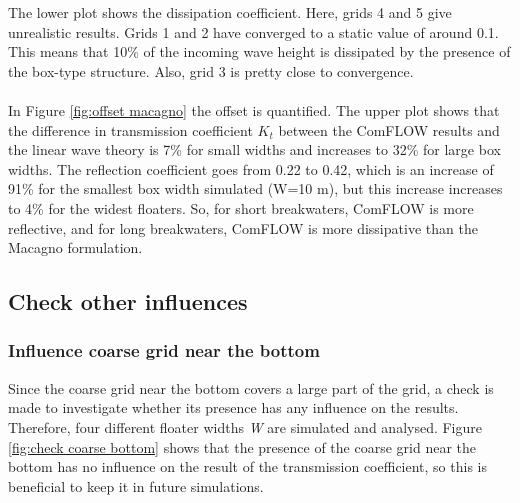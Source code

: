 

The lower plot shows the dissipation coefficient. Here, grids 4 and 5 give unrealistic results. Grids 1 and 2 have converged to a static value of around 0.1. This means that 10\% of the incoming wave height is dissipated by the presence of the box-type structure. Also, grid 3 is pretty close to convergence. \\
\\




In Figure \ref{fig:offset macagno} the offset is quantified. The upper plot shows that the difference in transmission coefficient $K_t$ between the ComFLOW results and the linear wave theory is 7\% for small widths and increases to 32\% for large box widths.
The reflection coefficient goes from 0.22 to 0.42, which is an increase of 91\% for the smallest box width simulated (W=10 m), but this increase increases to 4\% for the widest floaters. 
So, for short breakwaters, ComFLOW is more reflective, and for long breakwaters, ComFLOW is more dissipative than the Macagno formulation. 

\subsection{Check other influences}

\subsubsection{Influence coarse grid near the bottom}
Since the coarse grid near the bottom covers a large part of the grid, a check is made to investigate whether its presence has any influence on the results. Therefore, four different floater widths \textit{W} are simulated and analysed. Figure \ref{fig:check coarse bottom} shows that the presence of the coarse grid near the bottom has no influence on the result of the transmission coefficient, so this is beneficial to keep it in future simulations.


